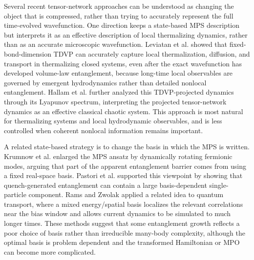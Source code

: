 \documentclass[12pt]{article}
\begin{document}
Several recent tensor-network approaches can be understood as changing the object that is compressed, rather than trying to accurately represent the full time-evolved wavefunction. One direction keeps a state-based MPS description but interprets it as an effective description of local thermalizing dynamics, rather than as an accurate microscopic wavefunction. Leviatan et al. \cite{leviatanQuantumThermalizationDynamics} showed that fixed-bond-dimension TDVP can accurately capture local thermalization, diffusion, and transport in thermalizing closed systems, even after the exact wavefunction has developed volume-law entanglement, because long-time local observables are governed by emergent hydrodynamics rather than detailed nonlocal entanglement. Hallam et al. \cite{hallamLyapunovSpectraQuantum2019} further analyzed this TDVP-projected dynamics through its Lyapunov spectrum, interpreting the projected tensor-network dynamics as an effective classical chaotic system. This approach is most natural for thermalizing systems and local hydrodynamic observables, and is less controlled when coherent nonlocal information remains important.

A related state-based strategy is to change the basis in which the MPS is written. Krumnow et al. \cite{krumnowOvercomingEntanglementBarrier2019} enlarged the MPS ansatz by dynamically rotating fermionic modes, arguing that part of the apparent entanglement barrier comes from using a fixed real-space basis. Pastori et al. \cite{pastoriDisentanglingSourcesQuantum2019} supported this viewpoint by showing that quench-generated entanglement can contain a large basis-dependent single-particle component. Rams and Zwolak \cite{ramsBreakingEntanglementBarrier2020} applied a related idea to quantum transport, where a mixed energy/spatial basis localizes the relevant correlations near the bias window and allows current dynamics to be simulated to much longer times. These methods suggest that some entanglement growth reflects a poor choice of basis rather than irreducible many-body complexity, although the optimal basis is problem dependent and the transformed Hamiltonian or MPO can become more complicated.
\end{document}
